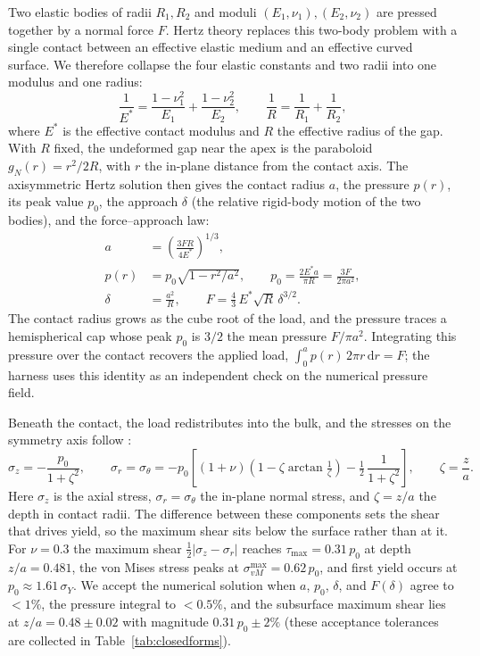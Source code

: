 \documentclass{svjour3}                 %
\newcommand{\gn}{g_{\scriptscriptstyle N}}
\begin{document}
\begin{appendix}
Two elastic bodies of radii $R_1,R_2$ and moduli $(E_1,\nu_1),(E_2,\nu_2)$ are pressed
together by a normal force $F$. Hertz theory replaces this two-body problem with a single
contact between an effective elastic medium and an effective curved surface. We therefore
collapse the four elastic constants and two radii into one modulus and one radius:
\begin{equation}\label{eq:hertz-effective}
  \frac{1}{E^\ast}=\frac{1-\nu_1^2}{E_1}+\frac{1-\nu_2^2}{E_2},
  \qquad
  \frac{1}{R}=\frac{1}{R_1}+\frac{1}{R_2},
\end{equation}
where $E^\ast$ is the effective contact modulus and $R$ the effective radius of the gap.
With $R$ fixed, the undeformed gap near the apex is the paraboloid $\gn(r)=r^2/2R$, with
$r$ the in-plane distance from the contact axis. The axisymmetric Hertz solution
\citep{johnson1985contact} then gives the contact radius $a$, the pressure $p(r)$, its
peak value $p_0$, the approach $\delta$ (the relative rigid-body motion of the two bodies),
and the force--approach law:
\begin{align}
  a &= \left(\frac{3FR}{4E^\ast}\right)^{1/3}, \label{eq:hertz-a}\\
  p(r) &= p_0\sqrt{1-r^2/a^2}, \qquad
  p_0 = \frac{2E^\ast a}{\pi R} = \frac{3F}{2\pi a^2}, \label{eq:hertz-p}\\
  \delta &= \frac{a^2}{R}, \qquad
  F = \frac{4}{3}\,E^\ast\sqrt{R}\,\delta^{3/2}. \label{eq:hertz-force}
\end{align}
The contact radius grows as the cube root of the load, and the pressure traces a
hemispherical cap whose peak $p_0$ is $3/2$ the mean pressure $F/\pi a^2$. Integrating
this pressure over the contact recovers the applied load, $\int_0^a p(r)\,2\pi
r\,\mathrm{d}r = F$; the harness uses this identity as an independent check on
the numerical pressure field.

Beneath the contact, the load redistributes into the bulk, and the stresses on the
symmetry axis follow \citep[Eq.~3.45]{johnson1985contact}:
\begin{equation}\label{eq:hertz-subsurface}
  \sigma_z = -\frac{p_0}{1+\zeta^2}, \qquad
  \sigma_r = \sigma_\theta
  = -p_0\!\left[(1+\nu)\!\left(1-\zeta\arctan\tfrac{1}{\zeta}\right)-\tfrac12\,\frac{1}{1+\zeta^2}\right],
  \qquad \zeta=\frac{z}{a}.
\end{equation}
Here $\sigma_z$ is the axial stress, $\sigma_r=\sigma_\theta$ the in-plane normal
stress, and $\zeta=z/a$ the depth in contact radii. The difference between these
components sets the shear that drives yield, so the maximum shear sits below the
surface rather than at it. For $\nu=0.3$ the maximum shear
$\tfrac12|\sigma_z-\sigma_r|$ reaches $\tau_{\max}=0.31\,p_0$ at depth $z/a=0.481$, the
von Mises stress peaks at $\sigma_{vM}^{\max}=0.62\,p_0$, and first yield occurs at
$p_0\approx 1.61\,\sigma_Y$. We accept the numerical solution when $a$, $p_0$, $\delta$,
and $F(\delta)$ agree to $<1\%$, the pressure integral to $<0.5\%$, and the subsurface
maximum shear lies at $z/a=0.48\pm0.02$ with magnitude $0.31\,p_0\pm2\%$ (these
acceptance tolerances are collected in Table~\ref{tab:closedforms}).


\end{appendix}
\end{document}
